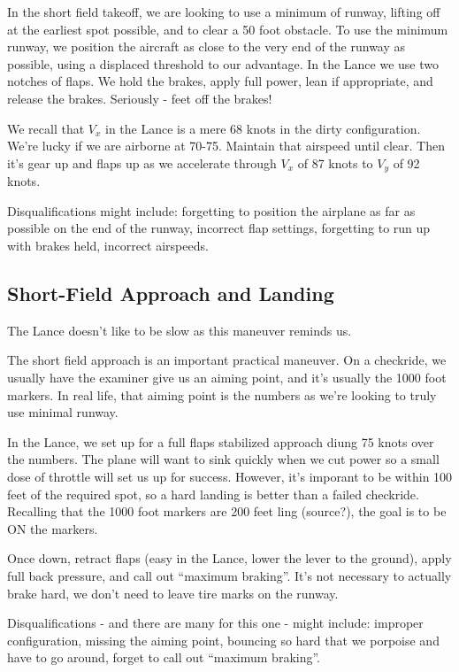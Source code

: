 In the short field takeoff, we are looking to use a minimum of runway, lifting off at the earliest spot possible, and to clear a 50 foot obstacle. To use the minimum runway, we position the aircraft as close to the very end of the runway as possible, using a displaced threshold to our advantage. In the Lance we use two notches of flaps. We hold the brakes, apply full power, lean if appropriate, and release the brakes. Seriously - feet off the brakes!

We recall that $V_x$ in the Lance is a mere 68 knots in the dirty configuration. We're lucky if we are airborne at 70-75. Maintain that airspeed until clear. Then it's gear up and flaps up as we accelerate through $V_x$ of 87 knots to $V_y$ of 92 knots.

Disqualifications might include: forgetting to position the airplane as far as possible on the end of the runway, incorrect flap settings, forgetting to run up with brakes held, incorrect airspeeds.

\subsection{Short-Field Approach and Landing}

The Lance doesn't like to be slow as this maneuver reminds us.

The short field approach is an important practical maneuver. On a checkride, we usually have the examiner give us an aiming point, and it's usually the 1000 foot markers. In real life, that aiming point is the numbers as we're looking to truly use minimal runway.

In the Lance, we set up for a full flaps stabilized approach diung 75 knots over the numbers. The plane will want to sink quickly when we cut power so a small dose of throttle will set us up for success. However, it's imporant to be within 100 feet of the required spot, so a hard landing is better than a failed checkride. Recalling that the 1000 foot markers are 200 feet ling (source?), the goal is to be ON the markers.

Once down, retract flaps (easy in the Lance, lower the lever to the ground), apply full back pressure, and call out ``maximum braking''. It's not necessary to actually brake hard, we don't need to leave tire marks on the runway.

Disqualifications - and there are many for this one - might include: improper configuration, missing the aiming point, bouncing so hard that we porpoise and have to go around, forget to call out ``maximum braking''.


